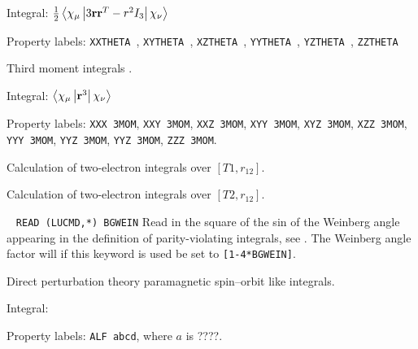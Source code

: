 \begin{description}
\begin{list}{}{}
\item Integral: $\frac{1}{2}\left<\chi_{\mu}\left|
3{\bf r} {\bf r}^{T} - r^{2}I_3
\right|\chi_{\nu}\right>$
\item Property labels: \verb|XXTHETA |, \verb|XYTHETA |,
\verb|XZTHETA |, \verb|YYTHETA |, \verb|YZTHETA |, \verb|ZZTHETA |
\end{list}

\item[\Key{THIRDM}] Third moment integrals
.

\begin{list}{}{}
\item Integral: $\left<\chi_{\mu}\left|{\bf r}^3\right|\chi_{\nu}\right>$
\item Property labels: \verb|XXX 3MOM|, \verb|XXY 3MOM|, \verb|XXZ 3MOM|, 
\verb|XYY 3MOM|, \verb|XYZ 3MOM|, \verb|XZZ 3MOM|, \verb|YYY 3MOM|, 
\verb|YYZ 3MOM|, \verb|YYZ 3MOM|, \verb|ZZZ 3MOM|. 
\end{list}

\item[\Key{U12INT}] Calculation of two-electron integrals over
  $\left[T1,r_{12}\right]$.

\item[\Key{U21INT}] Calculation of two-electron integrals over
  $\left[T2,r_{12}\right]$.

\item[\Key{WEINBG}]\verb| |\newline
\verb|READ (LUCMD,*) BGWEIN|\newline
Read in the square of the sin of the Weinberg angle appearing in the
definition of parity-violating integrals, see . The
Weinberg angle factor will if this keyword is used be set to
\verb|[1-4*BGWEIN]|. 

\item[\Key{XDDXR3}] Direct perturbation theory paramagnetic
  spin--orbit like integrals. 

\begin{list}{}{}
\item Integral:
\item Property labels: \verb|ALF abcd|, where $a$ is ????.
\end{list}

\end{description}


